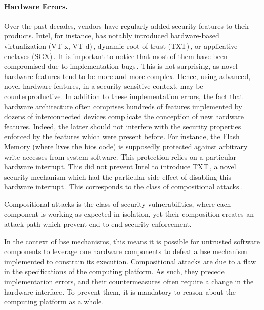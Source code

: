 \paragraph{Hardware Errors.}
%
Over the past decades, vendors have regularly added security features to their
products.
%
Intel, for instance, has notably introduced hardware-based virtualization (VT-x,
VT-d)\,\cite{intel2014manualvt}, dynamic root of trust
(TXT)\,\cite{intel2015txt}, or applicative enclaves
(SGX)\,\cite{intel2014manualsgx,costan2016sgxexplained}.
%
It is important to notice that most of them have been compromised due to
implementation bugs\,\cite{wojtczuk2011txtbug,sang2010iommu}.
%
This is not surprising, as novel hardware features tend to be more and more
complex.
%
Hence, using advanced, novel hardware features, in a security-sensitive context,
may be counterproductive.
%
In addition to these implementation errors, the fact that hardware architecture
often comprises hundreds of features implemented by dozens of interconnected
devices complicate the conception of new hardware features.
%
Indeed, the latter should not interfere with the security properties enforced by
the features which were present before.
%
For instance, the Flash Memory (where lives the \ac{bios} code) is supposedly
protected against arbitrary write accesses from system software.
%
This protection relies on a particular hardware interrupt.
%
This did not prevent Intel to introduce TXT\,\cite{intel2015txt}, a novel
security mechanism which had the particular side effect of disabling this
hardware interrupt\,\cite{kovah2015senter}.
%
This corresponds to the class of compositional
attacks\,\cite{wing2003compositionalattack}.

\begin{definition}
  Compositional attacks is the class of security vulnerabilities, where each
  component is working as expected in isolation, yet their composition creates
  an attack path which prevent end-to-end security enforcement.
\end{definition}

In the context of \ac{hse} mechanisms, this means it is possible for untrusted
software components to leverage one hardware components to defeat a \ac{hse}
mechanism implemented to constrain its execution.
%
Compositional attacks are due to a flaw in the specifications of the computing
platform.
%
As such, they precede implementation errors, and their countermeasures often
require a change in the hardware interface.
%
To prevent them, it is mandatory to reason about the computing platform as a
whole.

